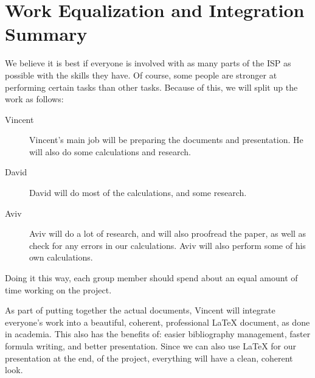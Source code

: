 \chapter{Work Equalization and Integration Summary}
	We believe it is best if everyone is involved with as many parts of the ISP as possible with the skills they have. Of course, some people are stronger at performing certain tasks than other tasks. Because of this, we will split up the work as follows:
	\begin{description}
		\item[Vincent] Vincent's main job will be preparing the documents and presentation. He will also do some calculations and research.
		\item[David] David will do most of the calculations, and some research.
		\item[Aviv] Aviv will do a lot of research, and will also proofread the paper, as well as check for any errors in our calculations. Aviv will also perform some of his own calculations.
	\end{description}
	Doing it this way, each group member should spend about an equal amount of time working on the project.

	As part of putting together the actual documents, Vincent will integrate everyone's work into a beautiful, coherent, professional \LaTeX{} document, as done in academia. This also has the benefits of: easier bibliography management, faster formula writing, and better presentation. Since we can also use \LaTeX{} for our presentation at the end, of the project, everything will have a clean, coherent look.
